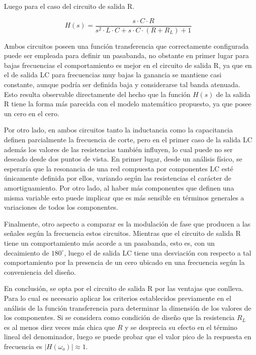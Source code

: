 Luego para el caso del circuito de salida R.

\begin{equation}
    H(s) = \frac{s \cdot C \cdot R}{s^{2} \cdot L \cdot C + s \cdot C \cdot (R+ R_L) + 1}
\end{equation}

Ambos circuitos poseen una funci\'on transferencia que correctamente configurada puede ser empleada para definir un pasabanda, no obstante en primer lugar para bajas frecuencias el comportamiento es mejor en el circuito de salida R,
ya que en el de salida LC para frecuencias muy bajas la ganancia se mantiene casi constante, aunque podr\'ia ser definida baja y considerarse tal banda atenuada. Esto resulta observable directamente del hecho que la funci\'on $H(s)$ de la salida R
tiene la forma m\'as parecida con el modelo matem\'atico propuesto, ya que posee un cero en el cero.

Por otro lado, en ambos circuitos tanto la inductancia como la capacitancia definen parcialmente la frecuencia de corte, pero en el primer caso de la salida LC adem\'as los valores de las resistencias tambi\'en influyen,
lo cual puede no ser deseado desde dos puntos de vista. En primer lugar, desde un an\'alisis f\'isico, se esperar\'ia que la resonancia de una red compuesta por componentes LC est\'e \'unicamente definida por ellos, variando seg\'un las resistencias
el car\'acter de amortiguamiento. Por otro lado, al haber m\'as componentes que definen una misma variable esto puede implicar que es m\'as sensible en t\'erminos generales a variaciones de todos los componentes.

Finalmente, otro aspecto a comparar es la modulaci\'on de fase que producen a las se\~nales seg\'un la frecuencia estos circuitos. Mientras que el circuito de salida R tiene un comportamiento m\'as acorde a un pasabanda, esto es,
con un decaimiento de $180^{\circ}$, luego el de salida LC tiene una desviaci\'on con respecto a tal comportamiento por la presencia de un cero ubicado en una frecuencia seg\'un la conveniencia del dise\~no.

En conclusi\'on, se opta por el circuito de salida R por las ventajas que conlleva. Para lo cual es necesario aplicar los criterios establecidos previamente en el an\'alisis de la funci\'on transferencia
para determinar la dimensi\'on de los valores de los componentes. Si se considera como condici\'on de dise\~no que la resistencia $R_L$ es al menos diez veces m\'as chica que $R$ y se desprecia su efecto en el t\'ermino
lineal del denominador, luego se puede probar que el valor pico de la respuesta en frecuencia es $|H(\omega_o)| \approx 1$.


